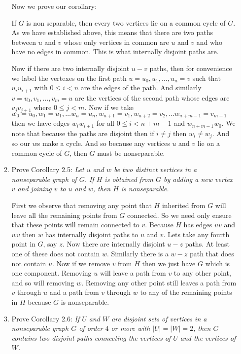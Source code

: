 \documentclass[letterpaper]{article}
\begin{document}
\begin{enumerate}
\begin{enumerate}
  Now we prove our corollary:

  If $G$ is non separable, then every two vertices lie on a common cycle of $G$. As we have established above, this means that there are two paths between $u$ and $v$ whose only vertices in common are $u$ and $v$ and who have no edges in common. This is what internally disjoint paths are. 

  Now if there are two internally disjoint $u-v$ paths, then for convenience we label the vertexes on the first path $u=u_0,u_1,\dots,u_n=v$ such that $u_iu_{i+1}$ with $0\le i<n$ are the edges of the path. And similarly $v=v_0,v_1,\dots,v_m=u$ are the vertices of the second path whose edges are $v_jv_{j+1}$ where $0\le j<m$. Now if we take $w_0=u_0,w_1=u_1,\dots w_n=u_n,w_{n+1}=v_1,w_{n+2}=v_2,\dots w_{n+m-1}=v_{m-1}$ then we have edges $w_iw_{i+1}$ for all $0\le i<n+m-1$ and $w_{n+m-1}w_0$. We note that because the paths are disjoint then if $i\ne j$ then $w_i\ne w_j$. And so our $w$s make a cycle. And so because any vertices $u$ and $v$ lie on a common cycle of $G$, then $G$ must be nonseparable.
  \item
  Prove Corollary 2.5: {\it Let $u$ and $w$ be two distinct vertices in a nonseparable graph of $G$. If $H$ is obtained from $G$ by adding a new vertex $v$ and joining $v$ to $u$ and $w$, then $H$ is nonseparable.}

First we observe that removing any point that $H$ inherited from $G$ will leave all the remaining points from $G$ connected. So we need only ensure that these points will remain connected to $v$. Because $H$ has edges $uv$ and $wv$ then $w$ has internally disjoint paths to $u$ and $v$. Lets take any fourth point in $G$, say $z$. Now there are internally disjoint $u-z$ paths. At least one of these does not contain $w$. Similarly there is a $w-z$ path that does not contain $u$. Now if we remove $v$ from $H$ then we just have $G$ which is one component. Removing $u$ will leave a path from $v$ to any other point, and so will removing $w$. Removing any other point still leaves a path from $v$ through $u$ and a path from $v$ through $w$ to any of the remaining points in $H$ because $G$ is nonseparable.
  \item
  Prove Corollary 2.6: {\it If $U$ and $W$ are disjoint sets of vertices in a nonseparable graph $G$ of order $4$ or more with $|U|=|W|=2$, then $G$ contains two disjoint paths connecting the vertices of $U$ and the vertices of $W$.}


\end{enumerate}
\end{enumerate}
\end{document}
